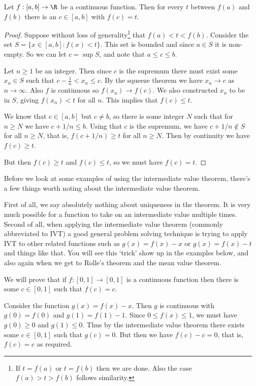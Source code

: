 \documentclass[a4paper]{scrartcl}
\begin{document}
\begin{theorem}
	Let $f: [a, b] \rightarrow \R$ be a continuous function. Then for every $t$ between $f(a)$ and $f(b)$ there is an $c \in [a, b]$ with $f(c) = t$.
\end{theorem}
\begin{proof}
Suppose without loss of generality\footnote{If $t = f(a)$ or $t = f(b)$ then we are done. Also the case $f(a)> t> f(b)$ follows similarity.} that $f(a) < t < f(b)$. Consider the set $S = \{x \in [a, b] : f(x) < t\}$. This set is bounded and since $a \in S$ it is non-empty. So we can let $c = \sup S$, and note that $a \leq c \leq b$.

Let $n \geq 1$ be an integer. Then since $c$ is the supremum there must exist some $x_n \in S$ such that $c - \frac{1}{n} < x_n \leq c$. 
By the squeeze theorem we have $x_n \rightarrow c$ as $n \rightarrow \infty$.
Also $f$ is continuous so $f(x_n) \rightarrow f(c)$. 
We also constructed $x_n$ to be in $S$, giving $f(x_n) < t$ for all $n$. This implies that $f(c) \leq t$. 

We know that $c \in [a, b]$ but $c \neq b$, so there is some integer $N$ such that for $n \geq N$ we have $c + 1/n \leq b$.
Using that $c$ is the supremum, we have $c + 1/n \not \in S$ for all $n \geq N$, that is, $f(c + 1/n) \geq t$ for all $n\geq N$.
Then by continuity we have $f(c) \geq t$. 

But then $f(c) \geq t$ and $f(c) \leq t$, so we must have $f(c) = t$.
\end{proof}

Before we look at some examples of using the intermediate value theorem, there's a few things worth noting about the intermediate value theorem.

First of all, we say absolutely nothing about uniqueness in the theorem. It is very much possible for a function to take on an intermediate value multiple times.
Second of all, when applying the intermediate value theorem (commonly abbreviated to IVT) a good general problem solving technique is trying to apply IVT to other related functions such as $g(x) = f(x) - x$ or $g(x) = f(x) - t$ and things like that. You will see this `trick' show up in the examples below, and also again when we get to Rolle's theorem and the mean value theorem.


\begin{example}
	We will prove that if $f:[0, 1] \rightarrow [0, 1]$ is a continuous function then there is some $c \in [0, 1]$ such that $f(c)=c$.

	Consider the function $g(x) = f(x) - x$. Then $g$ is continuous with $g(0) = f(0)$ and $g(1) = f(1) - 1$. 
	Since $0 \leq f(x) \leq 1$, we must have $g(0) \geq 0$ and $g(1) \leq 0$. Thus by the intermediate value theorem there exists some $c \in [0, 1]$ such that $g(c) = 0$. But then we have $f(c) - c = 0$, that is, $f(c) = c$ as required.
\end{example}
\end{document}
